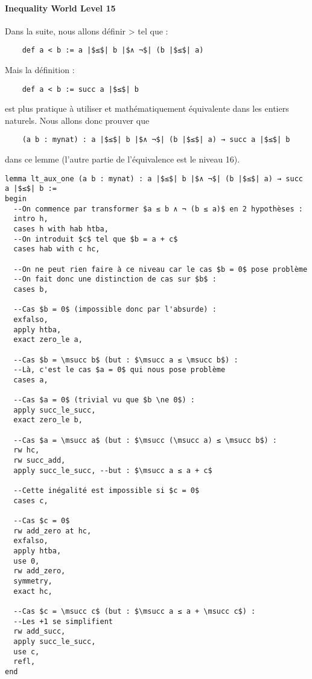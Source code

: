 \paragraph{Inequality World Level 15}

Dans la suite, nous allons définir > tel que :
\begin{verbatim}
	def a < b := a |$≤$| b |$∧ ¬$| (b |$≤$| a)
\end{verbatim}
Mais la définition :
\begin{verbatim}
	def a < b := succ a |$≤$| b
\end{verbatim}
est plus pratique à utiliser et mathématiquement équivalente dans les entiers naturels.
Nous allons donc prouver que 
\begin{verbatim}
	(a b : mynat) : a |$≤$| b |$∧ ¬$| (b |$≤$| a) → succ a |$≤$| b
\end{verbatim}
dans ce lemme (l'autre partie de l'équivalence est le niveau 16).

\begin{verbatim}
lemma lt_aux_one (a b : mynat) : a |$≤$| b |$∧ ¬$| (b |$≤$| a) → succ a |$≤$| b :=
begin
  --On commence par transformer $a ≤ b ∧ ¬ (b ≤ a)$ en 2 hypothèses :
  intro h,
  cases h with hab htba,
  --On introduit $c$ tel que $b = a + c$
  cases hab with c hc,

  --On ne peut rien faire à ce niveau car le cas $b = 0$ pose problème
  --On fait donc une distinction de cas sur $b$ :
  cases b,

  --Cas $b = 0$ (impossible donc par l'absurde) :
  exfalso,
  apply htba,
  exact zero_le a,

  --Cas $b = \msucc b$ (but : $\msucc a ≤ \msucc b$) :
  --Là, c'est le cas $a = 0$ qui nous pose problème
  cases a,

  --Cas $a = 0$ (trivial vu que $b \ne 0$) :
  apply succ_le_succ,
  exact zero_le b,

  --Cas $a = \msucc a$ (but : $\msucc (\msucc a) ≤ \msucc b$) :
  rw hc,
  rw succ_add,
  apply succ_le_succ, --but : $\msucc a ≤ a + c$
  
  --Cette inégalité est impossible si $c = 0$
  cases c,

  --Cas $c = 0$
  rw add_zero at hc,
  exfalso,
  apply htba,
  use 0,
  rw add_zero,
  symmetry,
  exact hc,

  --Cas $c = \msucc c$ (but : $\msucc a ≤ a + \msucc c$) :
  --Les +1 se simplifient
  rw add_succ,
  apply succ_le_succ,
  use c,
  refl,
end
\end{verbatim}
